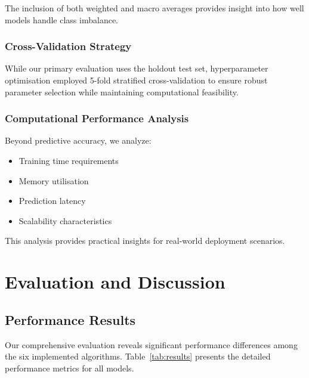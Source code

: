 \documentclass[11pt,a4paper]{article}
\begin{document}
The inclusion of both weighted and macro averages provides insight into how well models handle class imbalance.

\subsubsection{Cross-Validation Strategy}

While our primary evaluation uses the holdout test set, hyperparameter optimisation employed 5-fold stratified cross-validation to ensure robust parameter selection while maintaining computational feasibility.

\subsubsection{Computational Performance Analysis}

Beyond predictive accuracy, we analyze:
\begin{itemize}
    \item Training time requirements
    \item Memory utilisation
    \item Prediction latency
    \item Scalability characteristics
\end{itemize}

This analysis provides practical insights for real-world deployment scenarios.

\section{Evaluation and Discussion}

\subsection{Performance Results}

Our comprehensive evaluation reveals significant performance differences among the six implemented algorithms. Table~\ref{tab:results} presents the detailed performance metrics for all models.
\end{document}
